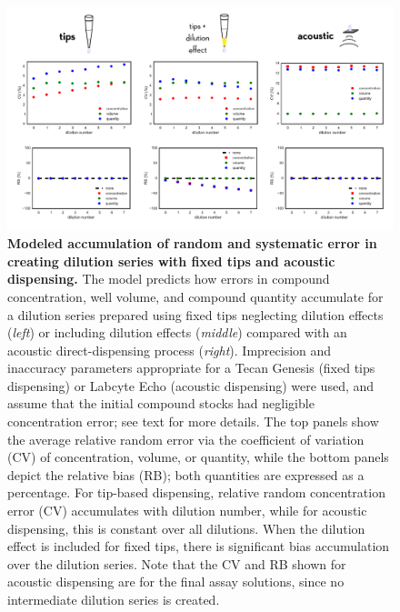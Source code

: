 \documentclass[aps,pre,twocolumn,nofootinbib,superscriptaddress,linenumbers]{revtex4-1}
\begin{document}
\begin{figure}[tb]
    \includegraphics[width=1.0\textwidth]{../figures/volumes-n-concentrations.pdf}

  \caption{{\bf Modeled accumulation of random and systematic error in creating dilution series with fixed tips and acoustic dispensing.}
  The model predicts how errors in compound concentration, well volume, and compound quantity accumulate for a dilution series prepared using fixed tips neglecting dilution effects (\emph{left}) or including dilution effects (\emph{middle}) compared with an acoustic direct-dispensing process (\emph{right}).
  Imprecision and inaccuracy parameters appropriate for a Tecan Genesis (fixed tips dispensing) or Labcyte Echo (acoustic dispensing) were used, and assume that the initial compound stocks had negligible concentration error; see text for more details.
  The top panels show the average relative random error via the coefficient of variation (CV) of concentration, volume, or quantity, while the bottom panels depict the relative bias (RB); both quantities are expressed as a percentage.
  For tip-based dispensing, relative random concentration error (CV) accumulates with dilution number, while for acoustic dispensing, this is constant over all dilutions.
  When the dilution effect is included for fixed tips, there is significant bias accumulation over the dilution series.
  Note that the CV and RB shown for acoustic dispensing are for the final assay solutions, since no intermediate dilution series is created.
  }
  \label{fig:volumes-n-concentrations}
\end{figure}
\end{document}
